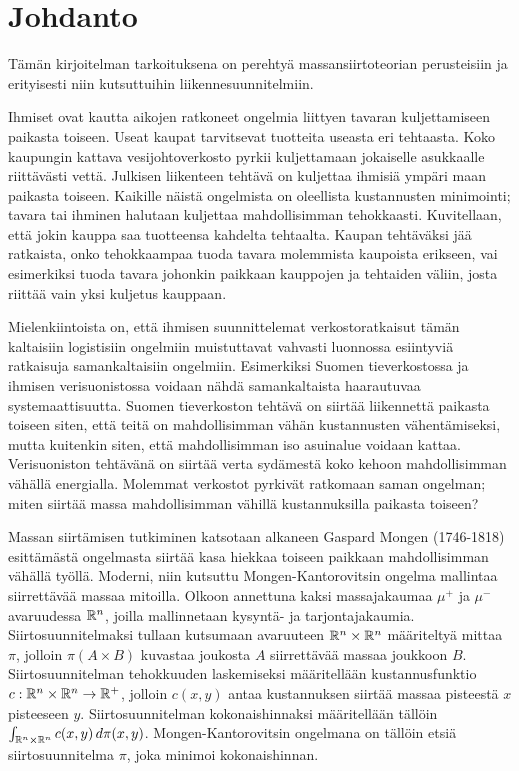 \documentclass[12pt,oneside,a4paper]{amsbook} %
\begin{document}
\pagebreak

\chapter*{Johdanto}
%
Tämän kirjoitelman tarkoituksena on perehtyä massansiirtoteorian perusteisiin ja erityisesti niin kutsuttuihin liikennesuunnitelmiin. 

Ihmiset ovat kautta aikojen ratkoneet ongelmia liittyen tavaran kuljettamiseen paikasta toiseen. Useat kaupat tarvitsevat tuotteita useasta eri tehtaasta. Koko kaupungin kattava vesijohtoverkosto pyrkii kuljettamaan jokaiselle asukkaalle riittävästi vettä. Julkisen liikenteen tehtävä on kuljettaa ihmisiä ympäri maan paikasta toiseen. Kaikille näistä ongelmista on oleellista kustannusten minimointi; tavara tai ihminen halutaan kuljettaa mahdollisimman tehokkaasti. Kuvitellaan, että jokin kauppa saa tuotteensa kahdelta tehtaalta. Kaupan tehtäväksi jää ratkaista, onko tehokkaampaa tuoda tavara molemmista kaupoista erikseen, vai esimerkiksi tuoda tavara johonkin paikkaan kauppojen ja tehtaiden väliin, josta riittää vain yksi kuljetus kauppaan.

Mielenkiintoista on, että ihmisen suunnittelemat verkostoratkaisut tämän kaltaisiin logistisiin ongelmiin muistuttavat vahvasti luonnossa esiintyviä ratkaisuja samankaltaisiin ongelmiin. Esimerkiksi Suomen tieverkostossa ja ihmisen verisuonistossa voidaan nähdä samankaltaista haarautuvaa systemaattisuutta. Suomen tieverkoston tehtävä on siirtää liikennettä paikasta toiseen siten, että teitä on mahdollisimman vähän kustannusten vähentämiseksi, mutta kuitenkin siten, että mahdollisimman iso asuinalue voidaan kattaa. Verisuoniston tehtävänä on siirtää verta sydämestä koko kehoon mahdollisimman vähällä energialla. Molemmat verkostot pyrkivät ratkomaan saman ongelman; miten siirtää massa mahdollisimman vähillä kustannuksilla paikasta toiseen? 

Massan siirtämisen tutkiminen katsotaan alkaneen Gaspard Mongen (1746-1818) esittämästä ongelmasta \cite{monge} siirtää kasa hiekkaa toiseen paikkaan mahdollisimman vähällä työllä. Moderni, niin kutsuttu Mongen-Kantorovitsin ongelma mallintaa siirrettävää massaa mitoilla. Olkoon annettuna kaksi massajakaumaa $\mu^+$ ja $\mu^-$ avaruudessa $\mathbb{R}^n$, joilla mallinnetaan kysyntä- ja tarjontajakaumia. Siirtosuunnitelmaksi tullaan kutsumaan avaruuteen $\mathbb{R}^n \times \mathbb{R}^n$ määriteltyä mittaa $\pi$, jolloin $\pi(A\times B)$ kuvastaa joukosta $A$ siirrettävää massaa joukkoon $B$. Siirtosuunnitelman tehokkuuden laskemiseksi määritellään kustannusfunktio $c:\mathbb{R}^n\times \mathbb{R}^n \to {\mathbb{R}^{+}}$, jolloin $c(x, y)$ antaa kustannuksen siirtää massaa pisteestä $x$ pisteeseen $y$. Siirtosuunnitelman kokonaishinnaksi määritellään tällöin $\int_{\mathbb{R}^n\times \mathbb{R}^n} c(x, y) \, d\pi(x, y)$. Mongen-Kantorovitsin ongelmana on tällöin etsiä siirtosuunnitelma $\pi$, joka minimoi kokonaishinnan. \cite[s. 11]{optimal}
\end{document}
